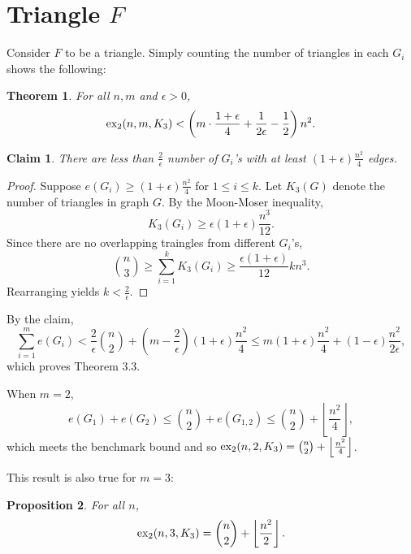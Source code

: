 \documentclass[12pt]{report}
\newtheorem{theorem}{Theorem}[chapter]
\newtheorem{claim}{Claim}
\newtheorem{proposition}[theorem]{Proposition}
\newcommand*{\dex}{\textnormal{ex}_2}
\begin{document}
\section{Triangle $F$}

Consider $F$ to be a triangle. Simply counting the number of triangles in each $G_i$ shows the following:

\begin{theorem}
  For all $n, m$ and $\epsilon > 0$,
  \[
    \dex(n, m, K_3) < \left(m \cdot \frac{1 + \epsilon}{4} + \frac{1}{2\epsilon} - \frac{1}{2}\right)n^2.
  \]
\end{theorem}

\begin{claim}
	There are less than $\frac{2}{\epsilon}$ number of $G_i$'s with at least $(1 + \epsilon)\frac{n^2}{4}$ edges.
\end{claim}

\begin{proof}
	Suppose $e(G_i) \geq (1 + \epsilon)\frac{n^2}{4}$ for $1\leq i \leq k$. Let $K_3(G)$ denote the number of triangles in graph $G$. By the Moon-Moser inequality,
	\[
		K_3(G_i) \geq \epsilon(1 + \epsilon)\frac{n^3}{12}.
	\]
	Since there are no overlapping traingles from different $G_i$'s, 
	\[
		\binom{n}{3} \geq \sum_{i = 1}^k K_3(G_i) \geq \frac{\epsilon(1 + \epsilon)}{12}kn^3.
	\]
	Rearranging yields $k < \frac{2}{\epsilon}$.
\end{proof}

By the claim, 
\[
  \sum_{i = 1}^m e(G_i) < \frac{2}{\epsilon}\binom{n}{2} + \left(m - \frac{2}{\epsilon}\right)(1 + \epsilon)\frac{n^2}{4} \leq m(1 + \epsilon)\frac{n^2}{4} + (1 - \epsilon)\frac{n^2}{2\epsilon},
\]
which proves Theorem 3.3.

When $m = 2$, 
\[
	e(G_1) + e(G_2) \leq \binom{n}{2} + e(G_{1, 2}) \leq \binom{n}{2} + \left\lfloor \frac{n^2}{4} \right\rfloor,
\]
which meets the benchmark bound and so $\dex(n, 2, K_3) = \binom{n}{2} + \left\lfloor \frac{n^2}{4} \right\rfloor$.

This result is also true for $m = 3$:

\begin{proposition}
  For all $n$,
  \[
    \dex(n, 3, K_3) = \binom{n}{2} + \left\lfloor \frac{n^2}{2} \right\rfloor.
  \]
\end{proposition}
\end{document}
